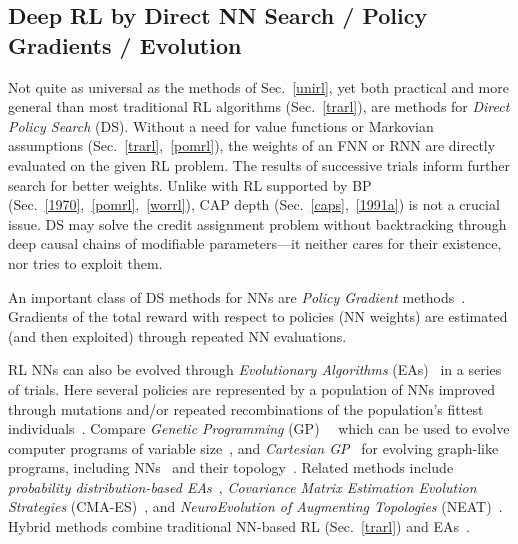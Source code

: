 \documentclass[letterpaper]{article}
\begin{document}
\begin{sloppypar}
\subsection{Deep RL by Direct NN Search / Policy Gradients / Evolution}
\label{evorl}

Not quite as universal as the methods of Sec.~\ref{unirl},
yet both practical and more general than most traditional RL algorithms (Sec.~\ref{trarl}), are 
methods for {\em Direct Policy Search} (DS).
Without a need for value functions or Markovian assumptions (Sec.~\ref{trarl},~\ref{pomrl}), 
the weights of an FNN or RNN are directly evaluated on the given RL problem.
The results of successive trials inform further search for better weights.
Unlike with RL supported by BP (Sec.~\ref{1970},~\ref{pomrl},~\ref{worrl}),
CAP depth (Sec.~\ref{caps},~\ref{1991a}) is not a crucial issue.
DS may solve the credit assignment problem without 
backtracking through deep causal chains of 
modifiable parameters---it neither cares for their existence,
nor tries to exploit them.


An important class of DS methods for NNs are 
{\em Policy Gradient}
methods~\citep{Williams:86,Williams:88,Williams:92,Sutton:99,baxter2001,aberdeenthesis,ghavamzadehICML03,stoneICRA04,wierstraCEC08,rueckstiess2008b,peters2008neuralnetworks,peters2008neurocomputing,sehnke2009parameter,gruettner2010multi,wierstra2010,peters2010,grondman2012,heess2012}.
Gradients of the total reward with respect to policies (NN weights) are 
estimated (and then exploited) through repeated NN evaluations.

RL NNs can also be evolved through
{\em Evolutionary Algorithms} (EAs)~\citep{Rechenberg:71,Schwefel:74,Holland:75,Fogel:66,goldberg:gabook89}
 in a series of trials.
Here several policies are represented by a population
of NNs improved through mutations and/or
repeated recombinations of the population's fittest individuals~\citep[e.g.,][]{montana1989,fogel1990,maniezzo1994,happel1994,nolfi1994}.
Compare {\em Genetic Programming} (GP)~\citep{Cramer:85}~\citep[see also][]{smith80} which
can be used to evolve computer programs of variable size~\citep{gp87,Koza:92},
and {\em Cartesian GP}~\citep{miller2000,miller2009} 
for evolving graph-like programs,
including NNs~\citep{khan2010} and their topology~\citep{turner2013}.
Related methods include 
{\em probability distribution-based EAs}~\citep{Baluja:94,saravanan:ieeeexpert95,Salustowicz:97ecj,Larraanaga2001}, 
{\em Covariance Matrix Estimation Evolution Strategies} (CMA-ES)~\citep{hansenCMA,hansen2003,igel:cec03,heidrich-meisner:09},
and {\em NeuroEvolution of Augmenting Topologies} (NEAT)~\citep{stanley:ec02}.
Hybrid methods combine traditional NN-based RL (Sec.~\ref{trarl}) and EAs~\citep[e.g.,][]{whiteson2006}.



\end{sloppypar}
\end{document}

